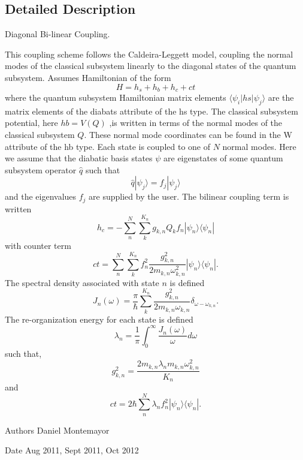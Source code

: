\subsection{Detailed Description}
Diagonal Bi-\/linear Coupling. 

This coupling scheme follows the Caldeira-\/\+Leggett model, coupling the normal modes of the classical subsystem linearly to the diagonal states of the quantum subsystem. Assumes Hamiltonian of the form \[ H=h_s+h_b+h_c+ct \] where the quantum subsystem Hamiltonian matrix elements $ \langle\psi_i|hs|\psi_j\rangle $ are the matrix elements of the diabats attribute of the hs type. The classical subsystem potential, here $ hb=V(Q) $ ,is written in terms of the normal modes of the classical subsystem $Q$. These normal mode coordinates can be found in the W attribute of the hb type. Each state is coupled to one of $ N $ normal modes. Here we assume that the diabatic basis states $ \psi $ are eigenstates of some quantum subsystem operator $ \hat q $ such that \[ \hat q |\psi_j\rangle =f_j|\psi_j\rangle \] and the eigenvalues $ f_j $ are supplied by the user. The bilinear coupling term is written \[ h_c=-\sum_n^N \sum_k^{K_n} g_{k,n} Q_{k} f_n |\psi_n\rangle\langle\psi_n|\] with counter term \[ ct=\sum_n^N \sum_k^{K_n} f_n^2 \frac{g_{k,n}^2}{2m_{k,n}\omega_{k,n}^2}|\psi_n\rangle\langle\psi_n|. \] The spectral density associated with state $ n $ is defined \[ J_n(\omega)=\frac{\pi}{\hbar}\sum_k^{K_n}\frac{g_{k,n}^2}{2m_{k,n}\omega_{k,n}}\delta_{\omega-\omega_{k,n}}.\] The re-\/organization energy for each state is defined \[ \lambda_n=\frac{1}{\pi} \int_0^\infty \frac{J_n(\omega)}{\omega} d\omega \] such that, \[ g_{k,n}^2=\frac{2m_{k,n} \lambda_n m_{k,n} \omega_{k,n}^2}{K_n}\] and \[ ct=2 \hbar \sum_n^N \lambda_n f_n^2|\psi_n\rangle\langle\psi_n| .\] \begin{DoxyAuthor}{Authors}
Daniel Montemayor
\end{DoxyAuthor}
\begin{DoxyDate}{Date}
Aug 2011, Sept 2011, Oct 2012 
\end{DoxyDate}


